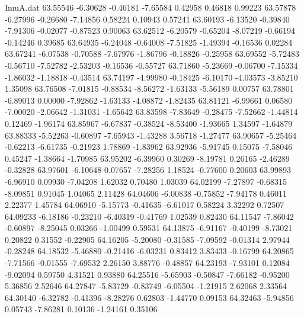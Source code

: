 \begin{filecontents}{ImuA.dat}
  63.55546   -6.30628   -0.46181   -7.65584    0.42958    0.46818    0.99223
  63.57878   -6.27996   -0.26680   -7.14856    0.58224    0.10943    0.57241
  63.60193   -6.13520   -0.39840   -7.91306   -0.02077   -0.87523    0.90063
  63.62512   -6.20579   -0.65204   -8.07219   -0.66194   -0.14246    0.39685
  63.64935   -6.24048   -0.64008   -7.51825   -1.49394   -0.16536    0.02284
  63.67241   -6.07538   -0.70588   -7.67976   -1.86796   -0.18826   -0.25958
  63.69552   -5.72483   -0.56710   -7.52782   -2.53203   -0.16536   -0.55727
  63.71860   -5.23669   -0.06700   -7.15334   -1.86032   -1.18818   -0.43514
  63.74197   -4.99980   -0.18425   -6.10170   -4.03573   -3.85210    1.35098
  63.76508   -7.01815   -0.88534   -8.56272   -1.63133   -5.56189    0.00757
  63.78801   -6.89013    0.00000   -7.92862   -1.63133   -4.08872   -1.82435
  63.81121   -6.99661    0.06580   -7.00020   -2.06642   -1.31031   -1.65642
  63.83598   -7.83649   -0.28475   -7.52662   -1.44814    0.12469   -1.96174
  63.85967   -6.67837   -0.38524   -8.53400   -1.93665    1.34597   -1.64879
  63.88333   -5.52263   -0.60897   -7.65943   -1.43288    3.56718   -1.27477
  63.90657   -5.25464   -0.62213   -6.61735   -0.21923    1.78869   -1.83962
  63.92936   -5.91745    0.15075   -7.58046    0.45247   -1.38664   -1.70985
  63.95202   -6.39960    0.30269   -8.19781    0.26165   -2.46289   -0.32828
  63.97601   -6.10648    0.07657   -7.28256    1.18524   -0.77600    0.20603
  63.99893   -6.96910    0.09930   -7.04208    1.62032    0.70480    1.03039
  64.02199   -7.27897   -0.68315   -8.09851    0.91045    1.04065    2.11428
  64.04606   -6.00838   -0.75852   -7.94178    0.46011    2.22377    1.45784
  64.06910   -5.15773   -0.41635   -6.61017    0.58224    3.32292    0.72507
  64.09233   -6.18186   -0.23210   -6.40319   -0.41769    1.02539    0.82430
  64.11547   -7.86042   -0.60897   -8.25045    0.03266   -1.00499    0.59531
  64.13875   -6.91167   -0.40199   -8.73021    0.20822    0.31552   -0.22905
  64.16205   -5.20080   -0.31585   -7.09592   -0.01314    2.97944   -0.28248
  64.18532   -5.46880   -0.21416   -6.03231    0.83412    3.83433   -0.16799
  64.20865   -7.71566   -0.01555   -7.69532    2.26150    3.88776   -0.48857
  64.23193   -7.93101    0.12084   -9.02094    0.59750    4.31521    0.93880
  64.25516   -5.65903   -0.50847   -7.66182   -0.95200    5.36856    2.52646
  64.27847   -5.83729   -0.83749   -6.05504   -1.21915    2.62068    2.33564
  64.30140   -6.32782   -0.41396   -8.28276    0.62803   -1.44770    0.09153
  64.32463   -5.94856    0.05743   -7.86281    0.10136   -1.24161    0.35106

\end{filecontents}
